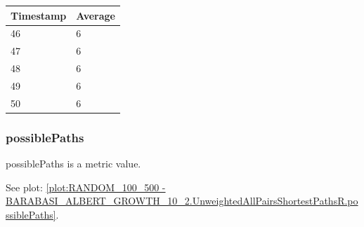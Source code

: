 \begin{tabular}{|l||l|}
\hline
	\textbf{Timestamp} & \textbf{Average} \\ \hline
	46 & 6 \\ \hline
	47 & 6 \\ \hline
	48 & 6 \\ \hline
	49 & 6 \\ \hline
	50 & 6 \\ \hline
\end{tabular}

\subsubsection{possiblePaths}
possiblePaths is a metric value.

See plot: \ref{plot:RANDOM_100_500 - BARABASI_ALBERT_GROWTH_10_2.UnweightedAllPairsShortestPathsR.possiblePaths}.

